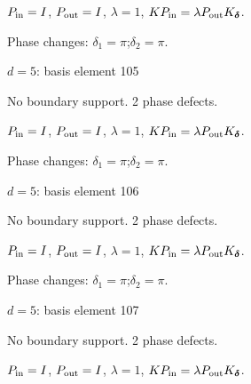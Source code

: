 \vspace{-1mm}
$P_{\rm in}=I$, \quad $P_{\rm out}=I$, \quad $\lambda=1$, \qquad $K P_{\rm in}=\lambda P_{\rm out}K_{\boldsymbol\delta}$.
\par\smallskip\begin{minipage}{.98\linewidth}\small Phase changes: $\delta_{1}=\pi$;\quad $\delta_{2}=\pi$.\end{minipage}
\vfill
{\footnotesize\texttt{}}
\newpage
{}
{\Large $d=5$: basis element 105}\par
No boundary support. 2 phase defects.
\begin{center}
\end{center}
\vspace{-1mm}
$P_{\rm in}=I$, \quad $P_{\rm out}=I$, \quad $\lambda=1$, \qquad $K P_{\rm in}=\lambda P_{\rm out}K_{\boldsymbol\delta}$.
\par\smallskip\begin{minipage}{.98\linewidth}\small Phase changes: $\delta_{1}=\pi$;\quad $\delta_{2}=\pi$.\end{minipage}
\vfill
{\footnotesize\texttt{}}
\newpage
{}
{\Large $d=5$: basis element 106}\par
No boundary support. 2 phase defects.
\begin{center}
\end{center}
\vspace{-1mm}
$P_{\rm in}=I$, \quad $P_{\rm out}=I$, \quad $\lambda=1$, \qquad $K P_{\rm in}=\lambda P_{\rm out}K_{\boldsymbol\delta}$.
\par\smallskip\begin{minipage}{.98\linewidth}\small Phase changes: $\delta_{1}=\pi$;\quad $\delta_{2}=\pi$.\end{minipage}
\vfill
{\footnotesize\texttt{}}
\newpage
{}
{\Large $d=5$: basis element 107}\par
No boundary support. 2 phase defects.
\begin{center}
\end{center}
\vspace{-1mm}
$P_{\rm in}=I$, \quad $P_{\rm out}=I$, \quad $\lambda=1$, \qquad $K P_{\rm in}=\lambda P_{\rm out}K_{\boldsymbol\delta}$.
